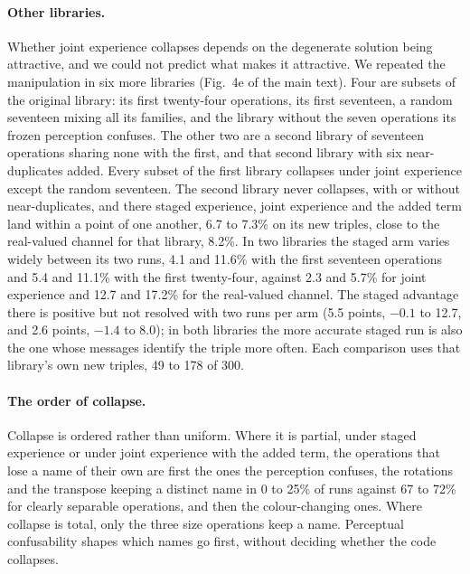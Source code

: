 \documentclass[11pt]{article}
\begin{document}
\paragraph{Other libraries.} Whether joint experience collapses depends on the degenerate solution being attractive,
and we could not predict what makes it attractive. We repeated the manipulation in six more libraries
(Fig.~4e of the main text). Four are subsets of the original library: its first twenty-four operations, its first
seventeen, a random seventeen mixing all its families, and the library without the seven operations its frozen
perception confuses. The other two are a second library of seventeen operations sharing none with the first, and
that second library with six near-duplicates added. Every subset of the first library collapses under joint experience except
the random seventeen. The second library never collapses, with or without near-duplicates, and there staged
experience, joint experience and the added term land within a point of one another, 6.7 to 7.3\% on its new
triples, close to the real-valued channel for that library, 8.2\%. In two libraries the staged arm
varies widely between its two runs, 4.1 and 11.6\% with the first seventeen operations and 5.4 and 11.1\% with
the first twenty-four, against 2.3 and 5.7\% for joint experience and 12.7 and 17.2\% for the real-valued
channel. The staged advantage there is positive but not resolved with two runs per arm (5.5 points, $-0.1$ to
12.7, and 2.6 points, $-1.4$ to 8.0); in both libraries the more accurate staged run is also the one whose
messages identify the triple more often. Each comparison uses that library's own new triples, 49 to 178 of 300.

\paragraph{The order of collapse.} Collapse is ordered rather than uniform. Where it is partial, under staged experience or under joint
experience with the added term, the operations that lose a name of their own are first the ones the perception
confuses, the rotations and the transpose keeping a distinct name in 0 to 25\% of runs against 67 to 72\% for
clearly separable operations, and then the colour-changing ones. Where collapse is total, only the three size
operations keep a name. Perceptual confusability shapes which names go first, without deciding whether the code
collapses.
\end{document}

